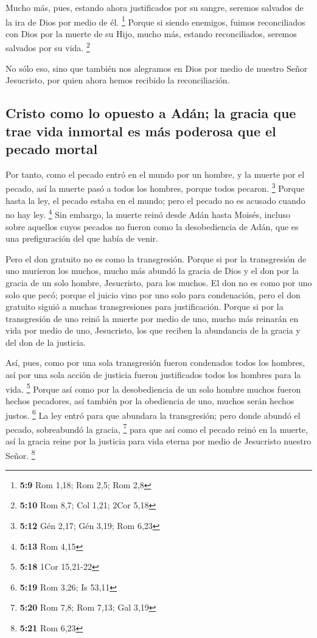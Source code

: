  Mucho más, pues, estando ahora justificados por su
sangre, seremos salvados de la ira de Dios por medio de él. \footnote{\textbf{5:9}
  Rom 1,18; Rom 2,5; Rom 2,8}  Porque si siendo enemigos,
fuimos reconciliados con Dios por la muerte de su Hijo, mucho más,
estando reconciliados, seremos salvados por su vida. \footnote{\textbf{5:10}
  Rom 8,7; Col 1,21; 2Cor 5,18}

 No sólo eso, sino que también nos alegramos en Dios por
medio de nuestro Señor Jesucristo, por quien ahora hemos recibido la
reconciliación.

\hypertarget{cristo-como-lo-opuesto-a-aduxe1n-la-gracia-que-trae-vida-inmortal-es-muxe1s-poderosa-que-el-pecado-mortal}{%
\subsection{Cristo como lo opuesto a Adán; la gracia que trae vida
inmortal es más poderosa que el pecado
mortal}\label{cristo-como-lo-opuesto-a-aduxe1n-la-gracia-que-trae-vida-inmortal-es-muxe1s-poderosa-que-el-pecado-mortal}}

 Por tanto, como el pecado entró en el mundo por un
hombre, y la muerte por el pecado, así la muerte pasó a todos los
hombres, porque todos pecaron. \footnote{\textbf{5:12} Gén 2,17; Gén
  3,19; Rom 6,23}  Porque hasta la ley, el pecado estaba
en el mundo; pero el pecado no es acusado cuando no hay ley. \footnote{\textbf{5:13}
  Rom 4,15}  Sin embargo, la muerte reinó desde Adán
hasta Moisés, incluso sobre aquellos cuyos pecados no fueron como la
desobediencia de Adán, que es una prefiguración del que había de venir.

 Pero el don gratuito no es como la transgresión. Porque
si por la transgresión de uno murieron los muchos, mucho más abundó la
gracia de Dios y el don por la gracia de un solo hombre, Jesucristo,
para los muchos.  El don no es como por uno solo que
pecó; porque el juicio vino por uno solo para condenación, pero el don
gratuito siguió a muchas transgresiones para justificación.
 Porque si por la transgresión de uno reinó la muerte por
medio de uno, mucho más reinarán en vida por medio de uno, Jesucristo,
los que reciben la abundancia de la gracia y del don de la justicia.

 Así, pues, como por una sola transgresión fueron
condenados todos los hombres, así por una sola acción de justicia fueron
justificados todos los hombres para la vida. \footnote{\textbf{5:18}
  1Cor 15,21-22}  Porque así como por la desobediencia de
un solo hombre muchos fueron hechos pecadores, así también por la
obediencia de uno, muchos serán hechos justos. \footnote{\textbf{5:19}
  Rom 3,26; Is 53,11}  La ley entró para que abundara la
transgresión; pero donde abundó el pecado, sobreabundó la gracia,
\footnote{\textbf{5:20} Rom 7,8; Rom 7,13; Gal 3,19} 
para que así como el pecado reinó en la muerte, así la gracia reine por
la justicia para vida eterna por medio de Jesucristo nuestro Señor.
\footnote{\textbf{5:21} Rom 6,23}

